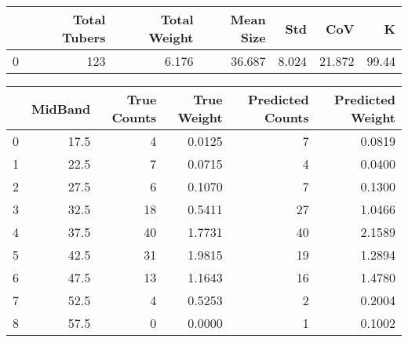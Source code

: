 \begin{tabular}{lrrrrrr}
\toprule
{} &  Total Tubers &  Total Weight &  Mean Size &    Std &     CoV &      K \\
\midrule
0 &           123 &         6.176 &     36.687 &  8.024 &  21.872 &  99.44 \\
\bottomrule
\end{tabular}

\begin{tabular}{lrrrrr}
\toprule
{} &  MidBand &  True Counts &  True Weight &  Predicted Counts &  Predicted Weight \\
\midrule
0 &     17.5 &            4 &       0.0125 &                 7 &            0.0819 \\
1 &     22.5 &            7 &       0.0715 &                 4 &            0.0400 \\
2 &     27.5 &            6 &       0.1070 &                 7 &            0.1300 \\
3 &     32.5 &           18 &       0.5411 &                27 &            1.0466 \\
4 &     37.5 &           40 &       1.7731 &                40 &            2.1589 \\
5 &     42.5 &           31 &       1.9815 &                19 &            1.2894 \\
6 &     47.5 &           13 &       1.1643 &                16 &            1.4780 \\
7 &     52.5 &            4 &       0.5253 &                 2 &            0.2004 \\
8 &     57.5 &            0 &       0.0000 &                 1 &            0.1002 \\
\bottomrule
\end{tabular}

